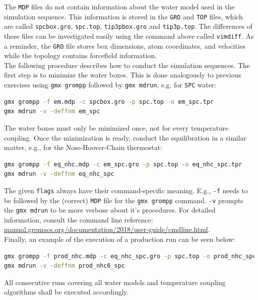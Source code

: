 \documentclass[9pt,tutorial]{livecoms}
\newcommand{\code}[1]{\colorbox{light-gray}{\texttt{#1}}}
\begin{document}
The \texttt{MDP} files do not contain information about the water model used in the simulation sequence. This information is stored in the \texttt{GRO} and \texttt{TOP} files, which are called \code{spcbox.gro}, \code{spc.top}, \code{tip3pbox.gro} and \code{tip3p.top}. The differences of these files can be investigated easily using the command above called \code{vimdiff}. As a reminder, the \texttt{GRO} file stores box dimensions, atom coordinates, and velocities while the topology contains forcefield information.\\
The following procedure describes how to conduct the simulation sequences. The first step is to minimize the water boxes. This is done analogously to previous exercises using \code{gmx grompp} followed by \code{gmx mdrun}, e.g. for \code{SPC} water:
\begin{lstlisting}[language=bash]
gmx grompp -f em.mdp -c spcbox.gro -p spc.top -o em_spc.tpr
gmx mdrun -v -deffnm em_spc
\end{lstlisting}
The water boxes must only be minimized once, not for every temperature coupling. Once the minimization is ready, conduct the equilibration in a similar matter, e.g., for the Nose-Hoover-Chain thermostat:
\begin{lstlisting}[language=bash]
gmx grompp -f eq_nhc.mdp -c em_spc.gro -p spc.top -o eq_nhc_spc.tpr
gmx mdrun -v -deffnm eq_nhc_spc
\end{lstlisting}
The given \texttt{flags} always have their command-specific meaning. E.g., \code{-f} needs to be followed by the (correct) \texttt{MDP} file for the \code{gmx grompp} command. \code{-v} prompts the \code{gmx mdrun} to be more verbose about it's procedures. For detailed information, consult the command line reference: \url{manual.gromacs.org/documentation/2018/user-guide/cmdline.html}.\\
Finally, an example of the execution of a production run can be seen below:
\begin{lstlisting}[language=bash]
gmx grompp -f prod_nhc.mdp -c eq_nhc_spc.gro -p spc.top -o prod_nhc_spc.tpr
gmx mdrun -v -deffnm prod_nhc6_spc
\end{lstlisting}
All consecutive runs covering all water models and temperature coupling algorithms shall be executed accordingly.\\
\end{document}
